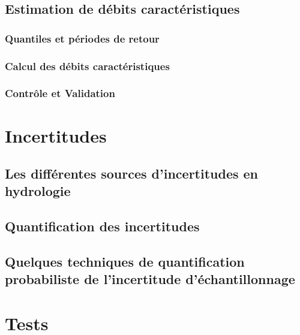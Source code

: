 \documentclass[
]{book}
\begin{document}
\section{Estimation de débits caractéristiques}\label{estimation-de-duxe9bits-caractuxe9ristiques}

\subsection{Quantiles et périodes de retour}\label{quantiles-et-puxe9riodes-de-retour}

\subsection{Calcul des débits caractéristiques}\label{calcul-des-duxe9bits-caractuxe9ristiques}

\subsection{Contrôle et Validation}\label{contruxf4le-et-validation}

\chapter{Incertitudes}\label{incertitudes}

\section{Les différentes sources d'incertitudes en hydrologie}\label{les-diffuxe9rentes-sources-dincertitudes-en-hydrologie}

\section{Quantification des incertitudes}\label{quantification-des-incertitudes}

\section{Quelques techniques de quantification probabiliste de l'incertitude d'échantillonnage}\label{quelques-techniques-de-quantification-probabiliste-de-lincertitude-duxe9chantillonnage}

\chapter{Tests}\label{tests}
\end{document}
